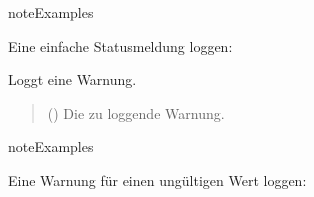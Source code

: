 \documentclass[letterpaper,10pt,english]{sphinxmanual}
\begin{document}
\begin{fulllineitems}
\begin{fulllineitems}
\begin{sphinxadmonition}{note}{Examples}

\sphinxAtStartPar
Eine einfache Statusmeldung loggen:

\begin{sphinxVerbatim}[commandchars=\\\{\}]
\end{sphinxVerbatim}
\end{sphinxadmonition}

\end{fulllineitems}


\begin{fulllineitems}
\label{\detokenize{modulab/log_manager:modules.log.LogManager.LogManager.warning}}
\pysigstartsignatures
\pysiglinewithargsret
{}
{}
{}
\pysigstopsignatures
\sphinxAtStartPar
Loggt eine Warnung.
\begin{quote}\begin{description}
\sphinxAtStartPar
{} () \textendash{} Die zu loggende Warnung.

\end{description}\end{quote}

\begin{sphinxadmonition}{note}{Examples}

\sphinxAtStartPar
Eine Warnung für einen ungültigen Wert loggen:

\begin{sphinxVerbatim}[commandchars=\\\{\}]
\end{sphinxVerbatim}
\end{sphinxadmonition}

\end{fulllineitems}


\end{fulllineitems}
\end{document}
